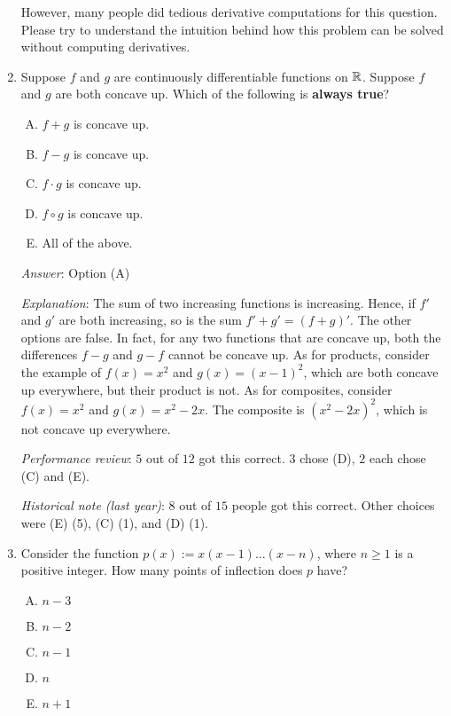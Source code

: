 \documentclass[10pt]{amsart}
\begin{document}
\begin{enumerate}
  However, many people did tedious derivative computations for this
  question. Please try to understand the intuition behind how this
  problem can be solved without computing derivatives.
\item Suppose $f$ and $g$ are continuously differentiable functions on
  $\mathbb{R}$. Suppose $f$ and $g$ are both concave up. Which of the
  following is {\bf always true}?

  \begin{enumerate}[(A)]
  \item $f + g$ is concave up.
  \item $f - g$ is concave up.
  \item $f \cdot g$ is concave up.
  \item $f \circ g$ is concave up.
  \item All of the above.
  \end{enumerate}

  {\em Answer}: Option (A)

  {\em Explanation}: The sum of two increasing functions is
  increasing. Hence, if $f'$ and $g'$ are both increasing, so is the
  sum $f' + g' = (f + g)'$. The other options are false. In fact, for
  any two functions that are concave up, both the differences $f - g$
  and $g - f$ cannot be concave up. As for products, consider the
  example of $f(x) = x^2$ and $g(x) = (x - 1)^2$, which are both
  concave up everywhere, but their product is not. As for composites,
  consider $f(x) = x^2$ and $g(x) = x^2 - 2x$. The composite is $(x^2
  - 2x)^2$, which is not concave up everywhere.

  {\em Performance review}: $5$ out of $12$ got this correct. $3$
  chose (D), $2$ each chose (C) and (E).

{\em Historical note (last year)}: $8$ out of $15$ people got this
  correct. Other choices were (E) (5), (C) (1), and (D) (1).

\item Consider the function $p(x) := x(x-1) \dots (x - n)$, where $n
  \ge 1$ is a positive integer. How many points of inflection does $p$
  have?

  \begin{enumerate}[(A)]
  \item $n - 3$
  \item $n - 2$
  \item $n - 1$
  \item $n$
  \item $n + 1$
  \end{enumerate}


\end{enumerate}
\end{document}
